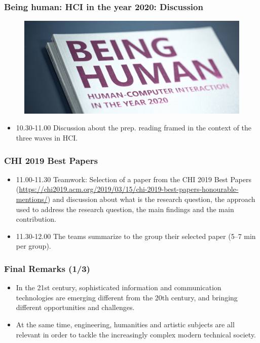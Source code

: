 \documentclass[screen, aspectratio=169]{beamer}
\begin{document}
%
\begin{frame}
\frametitle{Being human: HCI in the year 2020: Discussion}
 \begin{figure}
	\includegraphics[scale=0.12]{img/being-human.jpg}
    \end{figure}	
\begin{itemize}
\item 10.30-11.00 Discussion about the prep. reading framed in the context of the three waves in HCI.
\end{itemize}
\end{frame}
%
\begin{frame}
\frametitle{CHI 2019 Best Papers}
\begin{itemize}
\item 11.00-11.30 Teamwork: Selection of a paper from the CHI 2019 Best Papers (\url{https://chi2019.acm.org/2019/03/15/chi-2019-best-papers-honourable-mentions/}) and discussion about what is the research question, the approach used to address the research question, the main findings and the main contribution.
\item 11.30-12.00 The teams summarize to the group their selected paper (5--7 min per group).
\end{itemize}
\end{frame}
%
\begin{frame}
\frametitle{Final Remarks (1/3)}
\begin{itemize}
\item In the 21st century, sophisticated information and communication technologies are emerging different from the 20th century, and bringing different opportunities and challenges.
\item At the same time, engineering, humanities and artistic subjects are all relevant in order to tackle the increasingly complex modern technical society. 
\end{itemize}
\end{frame}
%
\end{document}
